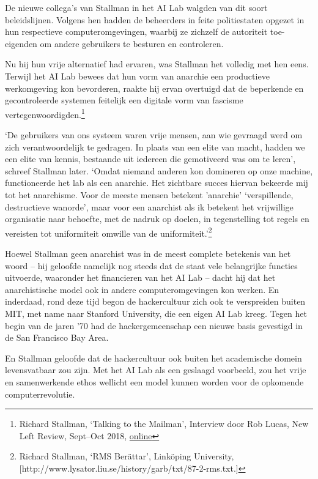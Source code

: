 \documentclass[
  a5paper,
  smalldemyvopaper,11pt,twoside,onecolumn,openright,extrafontsizes]{memoir}
\begin{document}
De nieuwe collega's van Stallman in het AI Lab walgden van dit soort
beleidslijnen. Volgens hen hadden de beheerders in feite politiestaten
opgezet in hun respectieve computeromgevingen, waarbij ze zichzelf de
autoriteit toe-eigenden om andere gebruikers te besturen en controleren.

Nu hij hun vrije alternatief had ervaren, was Stallman het volledig met
hen eens. Terwijl het AI Lab bewees dat hun vorm van anarchie een
productieve werkomgeving kon bevorderen, raakte hij ervan overtuigd dat
de beperkende en gecontroleerde systemen feitelijk een digitale vorm van
fascisme vertegenwoordigden.\footnote{\hspace{0pt}Richard Stallman,
  `Talking to the Mailman', Interview door Rob Lucas, New Left Review,
  Sept--Oct 2018,
  \href{https://newleftreview.org/issues/ii113/articles/richard-stallman-talking-to-the-mailman}{online}}

`De gebruikers van ons systeem waren vrije mensen, aan wie gevraagd werd
om zich verantwoordelijk te gedragen. In plaats van een elite van macht,
hadden we een elite van kennis, bestaande uit iedereen die gemotiveerd
was om te leren', schreef Stallman later. `Omdat niemand anderen kon
domineren op onze machine, functioneerde het lab als een anarchie. Het
zichtbare succes hiervan bekeerde mij tot het anarchisme. Voor de meeste
mensen betekent 'anarchie' `verspillende, destructieve wanorde', maar
voor een anarchist als ik betekent het vrijwillige organisatie naar
behoefte, met de nadruk op doelen, in tegenstelling tot regels en
vereisten tot uniformiteit omwille van de uniformiteit.'\footnote{\hspace{0pt}Richard
  Stallman, `RMS Berättar', Linköping University,
  {[}http://www.lysator.liu.se/history/garb/txt/87-2-rms.txt.{]}}

Hoewel Stallman geen anarchist was in de meest complete betekenis van
het woord -- hij geloofde namelijk nog steeds dat de staat vele
belangrijke functies uitvoerde, waaronder het financieren van het AI Lab
-- dacht hij dat het anarchistische model ook in andere
computeromgevingen kon werken. En inderdaad, rond deze tijd begon de
hackercultuur zich ook te verspreiden buiten MIT, met name naar Stanford
University, die een eigen AI Lab kreeg. Tegen het begin van de jaren '70
had de hackergemeenschap een nieuwe basis gevestigd in de San Francisco
Bay Area.

En Stallman geloofde dat de hackercultuur ook buiten het academische
domein levensvatbaar zou zijn. Met het AI Lab als een geslaagd
voorbeeld, zou het vrije en samenwerkende ethos wellicht een model
kunnen worden voor de opkomende computerrevolutie.
\end{document}
